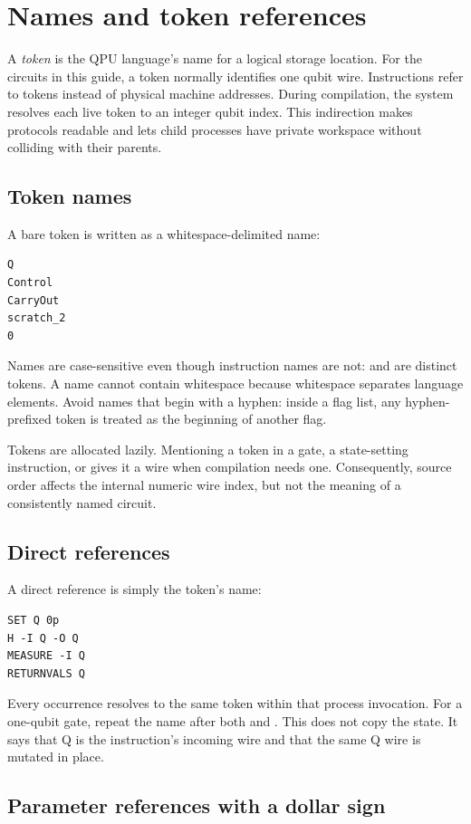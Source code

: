 \section{Names and token references}

A \emph{token} is the QPU language's name for a logical storage location. For
the circuits in this guide, a token normally identifies one qubit wire.
Instructions refer to tokens instead of physical machine addresses. During
compilation, the system resolves each live token to an integer qubit index.
This indirection makes protocols readable and lets child processes have private
workspace without colliding with their parents.

\subsection{Token names}

A bare token is written as a whitespace-delimited name:
\begin{lstlisting}
Q
Control
CarryOut
scratch_2
0
\end{lstlisting}
Names are case-sensitive even though instruction names are not:
 and  are distinct tokens. A name cannot contain
whitespace because whitespace separates language elements. Avoid names that
begin with a hyphen: inside a flag list, any hyphen-prefixed token is treated
as the beginning of another flag.

Tokens are allocated lazily. Mentioning a token in a gate, a state-setting
instruction, or  gives it a wire when compilation needs one.
Consequently, source order affects the internal numeric wire index, but not the
meaning of a consistently named circuit.

\subsection{Direct references}

A direct reference is simply the token's name:
\begin{lstlisting}
SET Q 0p
H -I Q -O Q
MEASURE -I Q
RETURNVALS Q
\end{lstlisting}
Every occurrence resolves to the same token within that process invocation.
For a one-qubit gate, repeat the name after both  and .
This does not copy the state. It says that Q is the instruction's incoming
wire and that the same Q wire is mutated in place.

\subsection{Parameter references with a dollar sign}

